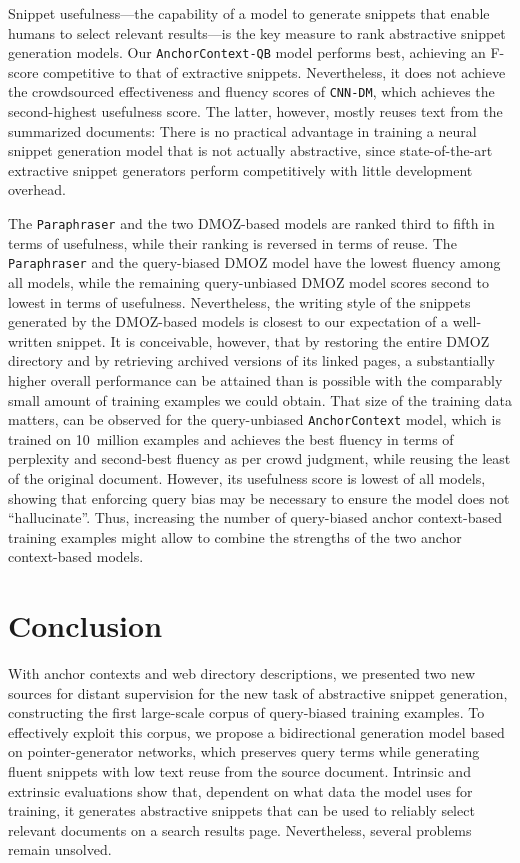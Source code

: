 \documentclass[sigconf]{acmart}
\begin{document}
Snippet usefulness---the capability of a model to generate snippets that enable humans to select relevant results---is the key measure to rank abstractive snippet generation models. Our {\small\tt AnchorContext-QB} model performs best, achieving an F-score competitive to that of extractive snippets. Nevertheless, it does not achieve the crowdsourced effectiveness and fluency scores of {\small\tt CNN-DM}, which achieves the second-highest usefulness score. The latter, however, mostly reuses text from the summarized documents: There is no practical advantage in training a neural snippet generation model that is not actually abstractive, since state-of-the-art extractive snippet generators perform competitively with little development overhead.

The {\small\tt Paraphraser} and the two DMOZ-based models are ranked third to fifth in terms of usefulness, while their ranking is reversed in terms of reuse. The {\small\tt Paraphraser} and the query-biased DMOZ model have the lowest fluency among all models, while the remaining query-unbiased DMOZ model scores second to lowest in terms of usefulness. Nevertheless, the writing style of the snippets generated by the DMOZ-based models is closest to our expectation of a well-written snippet. It is conceivable, however, that by restoring the entire DMOZ directory and by retrieving archived versions of its linked pages, a substantially higher overall performance can be attained than is possible with the comparably small amount of training examples we could obtain. That size of the training data matters,  can be observed for the query-unbiased {\small\tt AnchorContext} model, which is trained on 10~million examples and achieves the best fluency in terms of perplexity and second-best fluency as per crowd judgment, while reusing the least of the original document. However, its usefulness score is lowest of all models, showing that enforcing query bias may be necessary to ensure the model does not ``hallucinate''. Thus, increasing the number of query-biased anchor context-based training examples might allow to combine the strengths of the two anchor context-based models.

 \section{Conclusion}

With anchor contexts and web directory descriptions, we presented two new sources for distant supervision for the new task of abstractive snippet generation, constructing the first large-scale corpus of query-biased training examples. To effectively exploit this corpus, we propose a bidirectional generation model based on pointer-generator networks, which preserves query terms while generating fluent snippets with low text reuse from the source document. Intrinsic and extrinsic evaluations show that, dependent on what data the model uses for training, it generates abstractive snippets that can be used to reliably select relevant documents on a search results page. Nevertheless, several problems remain unsolved.
\end{document}

